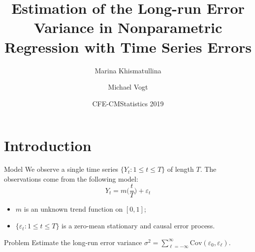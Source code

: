 \documentclass[10pt, handout]{beamer}
\title{Estimation of the Long-run Error Variance in Nonparametric Regression with Time Series Errors}
\date{CFE-CMStatistics 2019}
\author{Marina Khismatullina \inst{1} \and Michael Vogt \inst{1}}
\institute{\inst{1} University of Bonn}
\newcommand{\Cov}{\mathrm{Cov}}
\begin{document}
\maketitle


\section{Introduction}



%	

\begin{frame}{Model}
We observe a single time series $\{Y_t: 1 \le t \le T \}$ of length $T$. The observations come from the following model:
\begin{equation*}\label{model1}
Y_t = m \Big( \frac{t}{T} \Big) + \varepsilon_t 
\end{equation*}
\vspace{-6mm}
\begin{itemize}
\item $m$ is an unknown trend function on $[0,1]$;
\item $\{ \varepsilon_t: 1 \le t \le T \}$ is a zero-mean stationary and causal error process.\pause
\end{itemize}\begin{block}{Problem}
Estimate the long-run error variance $\sigma^2 = \sum\nolimits_{\ell=-\infty}^{\infty} \Cov(\varepsilon_0,\varepsilon_{\ell})$.
\end{block}

\end{frame}
\end{document}
